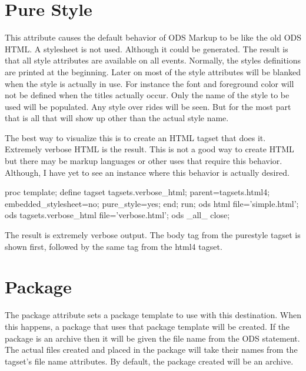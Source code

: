 \section{Pure Style}
This attribute causes the default behavior of ODS Markup to be like the old ODS HTML.
A stylesheet is not used.  Although it could be generated.  The result is that
all style attributes are available on all events.  Normally, the styles definitions
are printed at the beginning.  Later on most of the style attributes will be blanked
when the style is actually in use.  For instance the font and foreground color will
not be defined when the titles actually occur.  Only the name of the style to be used
will be populated.  Any style over rides will be seen.  But for the most part that is
all that will show up other than the actual style name.

The best way to visualize this
is to create an HTML tagset that does it.  Extremely verbose HTML is the result.
This is not a good way to create HTML but there may be markup languages or other
uses that require this behavior.  Although, I have yet to see an instance where
this behavior is actually desired.  

\begin{sfvcode}
proc template;
    define tagset tagsets.verbose_html;
        parent=tagsets.html4;
        embedded_stylesheet=no;
        pure_style=yes;
    end;
run;
ods html file='simple.html';
ods tagsets.verbose_html file='verbose.html';
ods _all_ close;
\end{sfvcode}

The result is extremely verbose output.  The body tag from the purestyle
tagset is shown first, followed by the same tag from the html4 tagset.


\section{Package}
The package attribute sets a package template to use with this destination.  When this
happens, a package that uses that package template will be created.  If the package
is an archive then it will be given the file name from the ODS statement.  The actual
files created and placed in the package will take their names from the tagset's 
file name attributes.  By default, the package created will be an archive.

